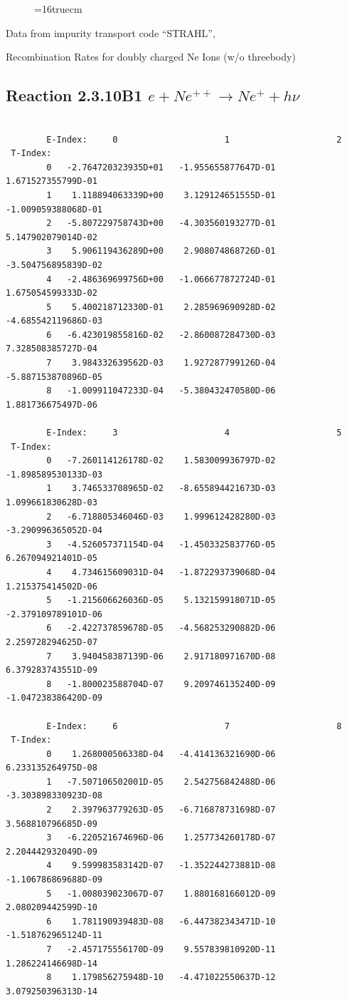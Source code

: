 \documentclass[12pt,dvips]{article}
\begin{document}
\begin{figure} \label{2.3.10B0}
\epsfxsize=16truecm
\end{figure}
\newpage
Data from impurity transport code ``STRAHL'', \cite{kn:Behringer}

  Recombination Rates for doubly  charged Ne Ions (w/o threebody)
\subsection{
Reaction 2.3.10B1   $e + Ne^{++}\rightarrow  Ne^+ + h\nu$
}



\begin{small}\begin{verbatim}

        E-Index:     0                     1                     2
 T-Index:
        0   -2.764720323935D+01   -1.955655877647D-01    1.671527355799D-01
        1    1.118894063339D+00    3.129124651555D-01   -1.009059388068D-01
        2   -5.807229758743D+00   -4.303560193277D-01    5.147902079014D-02
        3    5.906119436289D+00    2.908074868726D-01   -3.504756895839D-02
        4   -2.486369699756D+00   -1.066677872724D-01    1.675054599333D-02
        5    5.400218712330D-01    2.285969690928D-02   -4.685542119686D-03
        6   -6.423019855816D-02   -2.860087284730D-03    7.328508385727D-04
        7    3.984332639562D-03    1.927287799126D-04   -5.887153870896D-05
        8   -1.009911047233D-04   -5.380432470580D-06    1.881736675497D-06

        E-Index:     3                     4                     5
 T-Index:
        0   -7.260114126178D-02    1.583009936797D-02   -1.898589530133D-03
        1    3.746533708965D-02   -8.655894421673D-03    1.099661830628D-03
        2   -6.718805346046D-03    1.999612428280D-03   -3.290996365052D-04
        3   -4.526057371154D-04   -1.450332583776D-05    6.267094921401D-05
        4    4.734615609031D-04   -1.872293739068D-04    1.215375414502D-06
        5   -1.215606626036D-05    5.132159918071D-05   -2.379109789101D-06
        6   -2.422737859678D-05   -4.568253290882D-06    2.259728294625D-07
        7    3.940458387139D-06    2.917180971670D-08    6.379283743551D-09
        8   -1.800023588704D-07    9.209746135240D-09   -1.047238386420D-09

        E-Index:     6                     7                     8
 T-Index:
        0    1.268000506338D-04   -4.414136321690D-06    6.233135264975D-08
        1   -7.507106502001D-05    2.542756842488D-06   -3.303898330923D-08
        2    2.397963779263D-05   -6.716878731698D-07    3.568810796685D-09
        3   -6.220521674696D-06    1.257734260178D-07    2.204442932049D-09
        4    9.599983583142D-07   -1.352244273881D-08   -1.106786869688D-09
        5   -1.008039023067D-07    1.880168166012D-09    2.080209442599D-10
        6    1.781190939483D-08   -6.447382343471D-10   -1.518762965124D-11
        7   -2.457175556170D-09    9.557839810920D-11    1.286224146698D-14
        8    1.179856275948D-10   -4.471022550637D-12    3.079250396313D-14


\end{verbatim}
\end{small}
\end{document}
